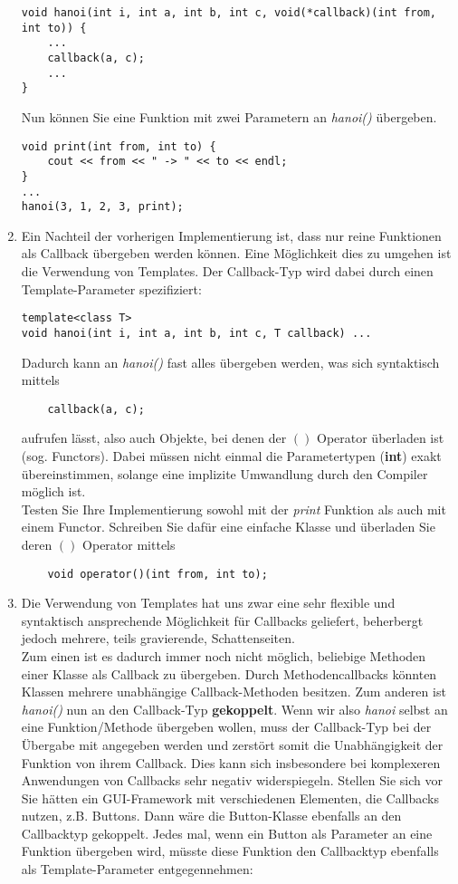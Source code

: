 \documentclass[
  accentcolor=tud1c,	%
  colorbacktitle,		%
  inverttitle,			%
  german,				%
  twoside
]{tudexercise}
\begin{document}
\begin{enumerate}
\begin{lstlisting}
void hanoi(int i, int a, int b, int c, void(*callback)(int from, int to)) {
	...
	callback(a, c);
	...
}
\end{lstlisting}

Nun können Sie eine Funktion mit zwei Parametern an \emph{hanoi()} übergeben.
\begin{lstlisting}
void print(int from, int to) {
	cout << from << " -> " << to << endl;
}
...
hanoi(3, 1, 2, 3, print);
\end{lstlisting}

\item
Ein Nachteil der vorherigen Implementierung ist, dass nur reine Funktionen als Callback übergeben werden können.  Eine Möglichkeit dies zu umgehen ist die Verwendung von Templates. Der Callback-Typ wird dabei durch einen Template-Parameter spezifiziert:
\begin{lstlisting}
template<class T>
void hanoi(int i, int a, int b, int c, T callback) ...
\end{lstlisting}

Dadurch kann an \emph{hanoi()} fast alles übergeben werden, was sich syntaktisch mittels
\begin{lstlisting}
	callback(a, c);
\end{lstlisting}
aufrufen lässt, also auch Objekte, bei denen der $()$ Operator überladen ist (sog. Functors). Dabei müssen nicht einmal die Parametertypen (\textbf{int}) exakt übereinstimmen, solange eine implizite Umwandlung durch den Compiler möglich ist. \\

Testen Sie Ihre Implementierung sowohl mit der \emph{print} Funktion als auch mit einem Functor. Schreiben Sie dafür eine einfache Klasse und überladen Sie deren $()$ Operator mittels 
\begin{lstlisting}
	void operator()(int from, int to);
\end{lstlisting}

\item Die Verwendung von Templates hat uns zwar eine sehr flexible und syntaktisch ansprechende Möglichkeit für Callbacks geliefert, beherbergt jedoch mehrere, teils gravierende, Schattenseiten. \\

Zum einen ist es dadurch immer noch nicht möglich, beliebige Methoden einer Klasse als Callback zu übergeben. Durch Methodencallbacks könnten Klassen mehrere unabhängige Callback-Methoden besitzen. Zum anderen ist \emph{hanoi()} nun an den Callback-Typ \textbf{gekoppelt}. Wenn wir also \emph{hanoi} selbst an eine Funktion/Methode übergeben wollen, muss der Callback-Typ bei der Übergabe mit angegeben werden und zerstört somit die Unabhängigkeit der Funktion von ihrem Callback. Dies kann sich insbesondere bei komplexeren Anwendungen von Callbacks sehr negativ widerspiegeln. Stellen Sie sich vor Sie hätten ein GUI-Framework mit verschiedenen Elementen, die Callbacks nutzen, z.B. Buttons. Dann wäre die Button-Klasse ebenfalls an den Callbacktyp gekoppelt. Jedes mal, wenn ein Button als Parameter an eine Funktion übergeben wird, müsste diese Funktion den Callbacktyp ebenfalls als Template-Parameter entgegennehmen:


\end{enumerate}
\end{document}
